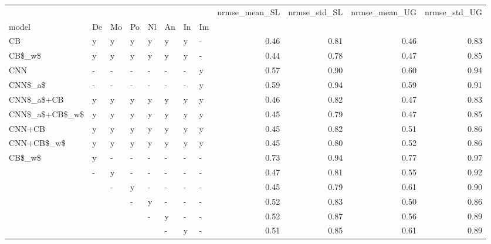 \begin{tabular}{llllllllrrrr}
\toprule
       &   &   &   &   &   &   &   &  nrmse\_mean\_SL &  nrmse\_std\_SL &  nrmse\_mean\_UG &  nrmse\_std\_UG \\
model & De & Mo & Po & Nl & An & In & Im &                &               &                &               \\
\midrule
CB & y & y & y & y & y & y & - &           0.46 &          0.81 &           0.46 &          0.83 \\
CB\$\_w\$ & y & y & y & y & y & y & - &           0.44 &          0.78 &           0.47 &          0.85 \\
CNN & - & - & - & - & - & - & y &           0.57 &          0.90 &           0.60 &          0.94 \\
CNN\$\_a\$ & - & - & - & - & - & - & y &           0.59 &          0.94 &           0.59 &          0.91 \\
CNN\$\_a\$+CB & y & y & y & y & y & y & y &           0.46 &          0.82 &           0.47 &          0.83 \\
CNN\$\_a\$+CB\$\_w\$ & y & y & y & y & y & y & y &           0.45 &          0.79 &           0.47 &          0.85 \\
CNN+CB & y & y & y & y & y & y & y &           0.45 &          0.82 &           0.51 &          0.86 \\
CNN+CB\$\_w\$ & y & y & y & y & y & y & y &           0.45 &          0.80 &           0.52 &          0.86 \\
CB\$\_w\$ & y & - & - & - & - & - & - &           0.73 &          0.94 &           0.77 &          0.97 \\
       & - & y & - & - & - & - & - &           0.47 &          0.81 &           0.55 &          0.92 \\
       &   & - & y & - & - & - & - &           0.45 &          0.79 &           0.61 &          0.90 \\
       &   &   & - & y & - & - & - &           0.52 &          0.83 &           0.50 &          0.86 \\
       &   &   &   & - & y & - & - &           0.52 &          0.87 &           0.56 &          0.89 \\
       &   &   &   &   & - & y & - &           0.51 &          0.85 &           0.61 &          0.89 \\
\bottomrule
\end{tabular}
